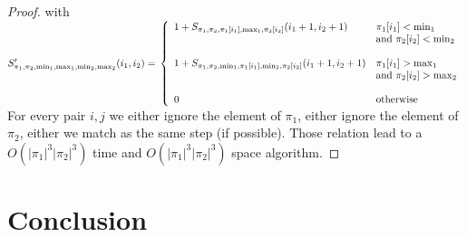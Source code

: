 \documentclass[a4paper]{llncs}
\begin{document}
\begin{proof}
	with 
	$S'_{\pi_1,\pi_2,\min_1,\max_1,\min_2,\max_2}(i_1,i_2)=\\ \left\{ 
				\begin{array}{l l}
					1+S_{\pi_1,\pi_2,\pi_1[i_1],\max_1,\pi_2[i_2]}(i_1+1,i_2+1)  & \text{$\pi_1[i_1]<\min_1$ } \\
					& \text{and $\pi_2[i_2]<\min_2$} \\
					&\\
					1+S_{\pi_1,\pi_2,\min_1,\pi_1[i_1],\min_2,\pi_2[i_2]}(i_1+1,i_2+1)  & \text{$\pi_1[i_1]>\max_1$ } \\	
					&\text{and $\pi_2[i_2]>\max_2$}\\	
					&\\	
					0 & \text{otherwise}\\							
				\end{array} \right.$\\
				
	For every pair $i,j$ we either ignore the element of $\pi_1$,
	either ignore the element of $\pi_2$, 
	either we match as the same step (if possible).
	Those relation lead to a $O(|\pi_1|^3|\pi_2|^3)$ time and $O(|\pi_1|^3|\pi_2|^3)$ space algorithm.		
	\end{proof}


			
%		
%		
	
	
		
	\section{Conclusion}
		


		  					
{}
	
			
				      
\end{document}
